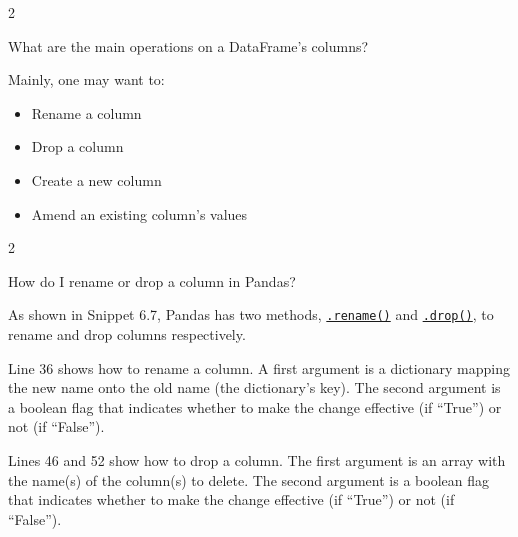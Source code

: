 \documentclass[a4paper,11pt]{book}
\newcommand{\question}[1]{%
    \begin{tcolorbox}[colback=comp_c!10,colframe=comp_c,sidebyside align=top,width=\linewidth,before skip=1ex]
        #1
    \end{tcolorbox}
    \switchcolumn%
}
\newcommand{\note}[1]{%
    \begin{tcolorbox}[colback=white!0,colframe=white!10,width=\linewidth,before skip=1ex]
        #1
    \end{tcolorbox}
}
\begin{document}
\begin{paracol}{2}
	\question{\raggedright What are the main operations on a DataFrame's columns?}
	\note{Mainly, one may want to:
	\begin{itemize}
		\item Rename a column
		\item Drop a column
		\item Create a new column
		\item Amend an existing column's values
	\end{itemize}
	}
\end{paracol}

\begin{paracol}{2}
	\question{\raggedright How do I rename or drop a column in Pandas?}
	\note{As shown in Snippet 6.7, Pandas has two methods, \href{https://pandas.pydata.org/docs/reference/api/pandas.DataFrame.rename.html?highlight=rename\#pandas.DataFrame.rename}{\texttt{.rename()}} and \href{https://pandas.pydata.org/docs/reference/api/pandas.DataFrame.drop.html?highlight=drop\#pandas.DataFrame.drop}{\texttt{.drop()}}, to rename and drop columns respectively.

	\quad Line 36 shows how to rename a column. A first argument is a dictionary mapping the new name onto the old name (the dictionary's key). The second argument is a boolean flag that indicates whether to make the change effective (if ``True'') or not (if ``False'').

	\quad Lines 46 and 52 show how to drop a column. The first argument is an array with the name(s) of the column(s) to delete. The second argument is a boolean flag that indicates whether to make the change effective (if ``True'') or not (if ``False'').
	}	
\end{paracol}
\end{document}
